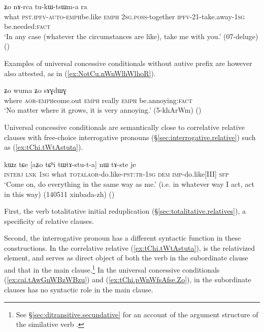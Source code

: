  \begin{exe}
\ex \label{ex:tChi.pWnWfsAfse.Zo}
 ʑo nɤ-rca tu-kɯ-tsɯm-a ra \\
what \textsc{pst}.\textsc{ipfv}-\textsc{auto}-\textsc{emph}\redp{}be.like \textsc{emph} \textsc{2sg}.\textsc{poss}-together \textsc{ipfv}-2\fl{}1-take.away-\textsc{1sg} be.needed:\textsc{fact} \\
\glt `In any case (whatever the circumstances are like), take me with you.' (07-deluge)
()
\end{exe}

Examples of universal concessive conditionals without autive prefix are however also attested, as in (\ref{ex:NotCu.nWnWlhWlhoR}).

\begin{exe}
\ex \label{ex:NotCu.nWnWlhWlhoR}
 ʑo wuma ʑo sɤɣdɯɣ \\
where \textsc{aor}-\textsc{emph}\redp{}come.out \textsc{emph} really \textsc{emph} be.annoying:\textsc{fact} \\
\glt `No matter where it grows, it is very annoying.' (5-khArWm)
()
\end{exe}

Universal concessive conditionals are semantically close to correlative relative clauses with free-choice interrogative pronouns (§\ref{sec:interrogative.relative}) such as (\ref{ex:tChi.tWtAstuta}). 

\begin{exe}
\ex \label{ex:tChi.tWtAstuta}
\gll kɯz tɕe [aʑo tɕʰi tɯ\redp{}tɤ-stu-t-a] nɯ tɤ-ste je \\
\textsc{interj} \textsc{lnk} \textsc{1sg} what \textsc{total}\redp{}\textsc{aor}-do.like-\textsc{pst}:\textsc{tr}-\textsc{1sg} \textsc{dem} \textsc{imp}-do.like[III] \textsc{sfp} \\
\glt `Come on, do everything in the same way as me.' (i.e. in whatever way I act, act in this way) (140511 xinbada-zh)
()
\end{exe}

First, the verb  totalitative initial reduplication (§\ref{sec:totalitative.relatives}), a specificity of relative clauses. 

Second, the interrogative pronoun  has a different syntactic function in these constructions. In the correlative relative (\ref{ex:tChi.tWtAstuta}),  is the relativized element, and serves as direct object of both the verb in the subordinate clause and that in the main clause.\footnote{See §\ref{sec:ditransitive.secundative} for an account of the argument structure of the similative verb . } In the universal concessive conditionals (\ref{ex:cai.tAwGnWBzWBzu}) and (\ref{ex:tChi.pWnWfsAfse.Zo}),  in the subordinate clauses has no syntactic role in the main clause.
  
